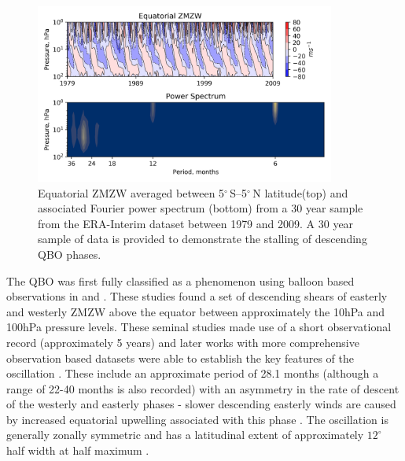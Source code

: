 \begin{figure}[h!]
\centering
    \includegraphics[width=0.88\textwidth]{Figures/Figures-background/QBO_SAO_ERA.png}
    \caption[Equatorial ZMZW and associated Fourier power spectrum from ERA-Interim.]{Equatorial ZMZW averaged between 5$^{\circ}$\,S--5$^{\circ}$\,N latitude(top) and associated Fourier power spectrum (bottom) from a 30 year sample from the ERA-Interim dataset between 1979 and 2009. A 30 year sample of data is provided to demonstrate the stalling of descending QBO phases.}
    \label{fig:QBO_SAO_ERA}
\centering
\end{figure}

The QBO was first fully classified as a phenomenon using balloon based observations in \cite{ebdonNotes1960, ebdonFluctuations1961} and \cite{reedQuasiBiennial1965}. These studies found a set of descending shears of easterly and westerly ZMZW above the equator between approximately the 10hPa and 100hPa pressure levels. These seminal studies made use of a short observational record (approximately 5 years) and later works with more comprehensive observation based datasets were able to establish the key features of the oscillation \citep{baldwinQuasiBiennial2001,pascoeQuasibiennial2005b}. These include an approximate period of 28.1 months (although a range of 22-40 months is also recorded) with an asymmetry in the rate of descent of the westerly and easterly phases - slower descending easterly winds are caused by increased equatorial upwelling associated with this phase \citep{pascoeQuasibiennial2005b}. The oscillation is generally zonally symmetric \citep{belmontVARIATION1968} and has a latitudinal extent of approximately $12^{\circ}$ half width at half maximum \citep{baldwinQuasiBiennial2001}.

